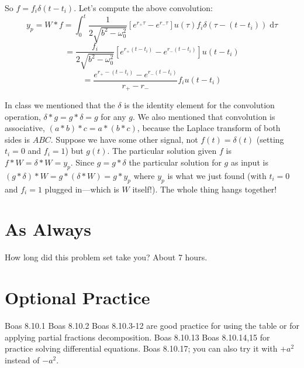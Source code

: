 \documentclass[answers]{exam}\newcommand{\repositoryInformationSetup}{     \usepackage[dvipsnames]{xcolor}     \usepackage[ angle=90, color=black, opacity=1, scale=2, ]{background}      \SetBgPosition{current page.west}      \SetBgVshift{-4.5mm}      \backgroundsetup{contents={{\color{green}\texttt{-{}-} differs from commit \texttt{40a9b87} in 0 files}}} } \newcommand{\commit}{{{\color{green}40a9b87}}}\usepackage{amsmath}
\newcommand{\oneover}[1]{\ensuremath{\frac{1}{#1}}}                             \newcommand{\inverse}{\ensuremath{^{-1}}}                                       \providecommand{\half}{\ensuremath{\frac{1}{2}} }                               \renewcommand{\half}{\ensuremath{\frac{1}{2}} }                                 \newcommand{\quarter}{\ensuremath{\frac{1}{4}} }
\providecommand{\id}{}
\renewcommand{\id}[1]{\ensuremath{\; \mathrm{d}#1}}
\begin{document}
\begin{questions}
\begin{parts}
		\begin{solution}
			So $f = f_i \delta(t-t_i)$. Let's compute the above convolution:
			$$  y_p = W\ast f = \int_0^t \oneover{2\sqrt{b^2-\omega_0^2}} \left[ e^{r_+ \tau} - e^{r_- \tau}\right] u(\tau) f_i \delta(\tau - (t - t_i)) \id{\tau}  $$
			$$ = \frac{f_i}{2\sqrt{b^2-\omega_0^2}} \left[ e^{r_+ (t-t_i)} - e^{r_- (t-t_i)}\right] u(t-t_i)$$
			$$ = \frac{e^{r_+-(t-t_i)} - e^{r_-(t-t_i)}}{r_+-r_-} f_i u(t-t_i)$$
		\end{solution}

	\end{parts}
	In class we mentioned that the $\delta$ is the identity element for the convolution operation, $\delta*g = g*\delta = g$ for any $g$.  We also mentioned that convolution is associative, $(a*b)*c = a*(b*c)$, because the Laplace transform of both sides is $ABC$.
	Suppose we have some other signal, not $f(t) = \delta(t)$ (setting $t_i=0$ and $f_i=1$) but $g(t)$.  The particular solution given $f$ is $f*W = \delta*W = y_p$.  Since $g= g*\delta$ the particular solution for $g$ as input is $(g*\delta)*W = g*(\delta*W) = g*y_p$ where $y_p$ is what we just found (with $t_i=0$ and $f_i=1$ plugged in---which is $W$ itself!).
	The whole thing hangs together!
	\section*{As Always}
	\question How long did this problem set take you? About 7 hours.

	\section*{Optional Practice}

	\question Boas 8.10.1
	\question Boas 8.10.2
	\question Boas 8.10.{3-12} are good practice for using the table or for applying partial fractions decomposition.
	\question Boas 8.10.13
	\question Boas 8.10.{14,15} for practice solving differential equations.
	\question Boas 8.10.17; you can also try it with $+a^2$ instead of $-a^2$.
\end{questions}
\end{document}
